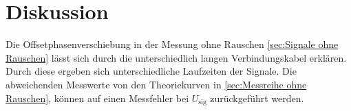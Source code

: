 \section{Diskussion}
\label{sec:Diskussion}
Die Offsetphasenverschiebung in der Messung ohne Rauschen \ref{sec:Signale ohne Rauschen}
lässt sich durch die unterschiedlich langen Verbindungskabel erklären. Durch diese
ergeben sich unterschiedliche Laufzeiten der Signale. Die abweichenden Messwerte
von den Theoriekurven in \ref{sec:Messreihe ohne Rauschen}, können auf einen
Messfehler bei $U_\text{sig}$ zurückgeführt werden.
